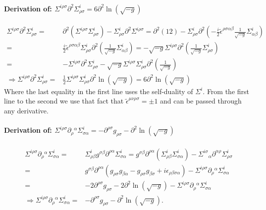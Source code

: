 \documentclass[10pt]{report}
\theoremstyle{definition}
\newcommand{\teps}[0]{\tilde{\epsilon}}
\begin{document}
        \paragraph{Derivation of: \texorpdfstring{$\Sigma^{i\rho\sigma} \partial^2 \Sigma^i_{\rho\sigma} = 6 \partial^2 \ln(\sqrt{-g})$}{Log}}
        \begin{align}
            \Sigma^{i\rho\sigma} \partial^2 \Sigma^i_{\rho\sigma} =& \partial^2 \left( \Sigma^{i\rho\sigma} \Sigma^i_{\rho\sigma} \right) - \Sigma^i_{\rho\sigma} \partial^2 \Sigma^{i\rho\sigma} = \partial^2 (12) - \Sigma^i_{\rho\sigma} \partial^2 \left( -\frac{i}{2}\teps^{\rho\sigma\alpha\beta} \frac{1}{\sqrt{-g}} \Sigma^i_{\alpha\beta} \right) \nonumber\\ =& \frac{i}{2} \teps^{\rho\sigma\alpha\beta} \Sigma^i_{\rho\sigma} \partial^2 \left(\frac{1}{\sqrt{-g}} \Sigma^i_{\alpha\beta} \right) = - \sqrt{-g}\Sigma^{i\rho\sigma} \partial^2 \left( \frac{1}{\sqrt{-g}} \Sigma^i_{\rho\sigma} \right) \nonumber\\ =& -\Sigma^{i\rho\sigma} \partial^2 \Sigma^i_{\rho\sigma} - \sqrt{-g} \Sigma^{i\rho\sigma} \Sigma^i_{\rho\sigma} \partial^2 \left( \frac{1}{\sqrt{-g}} \right) \nonumber\\[10pt] \Rightarrow \Sigma^{i\rho\sigma} \partial^2 \Sigma^i_{\rho\sigma} =& \frac{1}{2}\Sigma^{i\rho\sigma}\Sigma^i_{\rho\sigma}\partial^2 \ln(\sqrt{-g}) = 6 \partial^2 \ln(\sqrt{-g})
        \end{align}                                                                 
        Where the last equality in the first line uses the self-duality of $\Sigma^i$. From the first line to the second we use that fact that $\teps^{\mu\nu\rho\sigma} = \pm 1$ and can be passed through any derivative.

        \paragraph{Derivation of: \texorpdfstring{$\Sigma^{i\rho\sigma} \partial_\rho{}^\alpha \Sigma^i_{\sigma\alpha} = -\partial^{\rho\sigma} g_{\rho\sigma} - \partial^2 \ln(\sqrt{-g})$}{None}}
        \begin{align}
            \Sigma^{i\rho\sigma} \partial_\rho{}^\alpha \Sigma^i_{\sigma\alpha} =& \Sigma^i_{\rho\beta} g^{\sigma\beta} \partial^{\rho\alpha} \Sigma^i_{\sigma\alpha} = g^{\sigma\beta} \partial^{\rho\alpha}\left( \Sigma^i_{\rho\beta} \Sigma^i_{\sigma\alpha} \right) - \Sigma^{i\sigma}{}_\alpha \partial^{\alpha\rho} \Sigma^i_{\rho\sigma} \nonumber\\ =& g^{\sigma\beta} \partial^{\rho\alpha} \left( g_{\rho\sigma} g_{\beta\alpha} - g_{\rho\sigma} g_{\beta\sigma} + i \epsilon_{\rho\beta\sigma\alpha} \right) - \Sigma^{i\rho\sigma} \partial_\rho{}^\alpha \Sigma^i_{\sigma\alpha} \nonumber\\ =& -2 \partial^{\rho\sigma} g_{\rho\sigma} - 2 \partial^2 \ln(\sqrt{-g}) - \Sigma^{i\rho\sigma} \partial_\rho{}^\alpha \Sigma^i_{\sigma\alpha} \nonumber\\[10pt] \Rightarrow \Sigma^{i\rho\sigma} \partial_\rho{}^\alpha \Sigma^i_{\sigma\alpha} =& - \partial^{\rho\sigma} g_{\rho\sigma} - \partial^2 \ln(\sqrt{-g}).
        \end{align}
\end{document}
